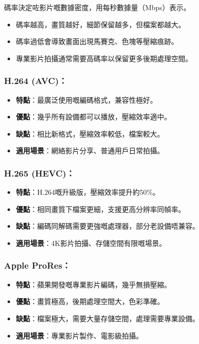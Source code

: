 碼率決定咗影片嘅數據密度，用每秒數據量（Mbps）表示。

\begin{itemize}
  \item 碼率越高，畫質越好，細節保留越多，但檔案都越大。
  \item 碼率過低會導致畫面出現馬賽克、色塊等壓縮痕跡。
  \item 專業影片拍攝通常需要高碼率以保留更多後期處理空間。
\end{itemize}


\subsubsection*{H.264 (AVC)：}

\begin{itemize}
  \item \textbf{特點}：最廣泛使用嘅編碼格式，兼容性極好。
  \item \textbf{優點}：幾乎所有設備都可以播放，壓縮效率適中。
  \item \textbf{缺點}：相比新格式，壓縮效率較低，檔案較大。
  \item \textbf{適用場景}：網絡影片分享、普通用戶日常拍攝。
\end{itemize}

\subsubsection*{H.265 (HEVC)：}

\begin{itemize}
  \item \textbf{特點}：H.264嘅升級版，壓縮效率提升約50\%。
  \item \textbf{優點}：相同畫質下檔案更細，支援更高分辨率同幀率。
  \item \textbf{缺點}：編碼同解碼需要更強嘅處理器，部分老設備唔兼容。
  \item \textbf{適用場景}：4K影片拍攝、存儲空間有限嘅場景。
\end{itemize}

\subsubsection*{Apple ProRes：}

\begin{itemize}
  \item \textbf{特點}：蘋果開發嘅專業影片編碼，幾乎無損壓縮。
  \item \textbf{優點}：畫質極高，後期處理空間大，色彩準確。
  \item \textbf{缺點}：檔案極大，需要大量存儲空間，處理需要專業設備。
  \item \textbf{適用場景}：專業影片製作、電影級拍攝。
\end{itemize}

